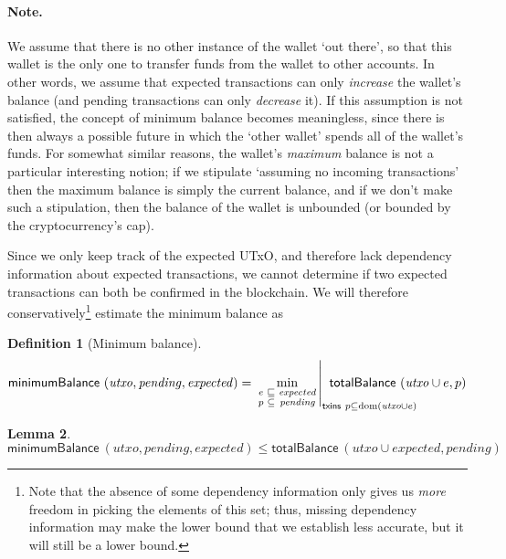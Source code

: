 \documentclass{article}
\DeclareMathOperator{\dom}{dom}
\DeclareMathOperator*{\minimum}{min}
\newtheorem{lemma}{Lemma}[section] %
\newtheorem{definition}[lemma]{Definition}
\numberwithin{equation}{lemma}
\begin{document}
\paragraph{Note.} We assume that there is no other instance of the wallet
`out there', so that this wallet is the only one to transfer funds
from the wallet to other accounts. In other words, we assume that expected
transactions can only \emph{increase} the wallet's balance (and pending
transactions can only \emph{decrease} it). If this assumption is not satisfied,
the concept of minimum balance becomes meaningless, since there is then always
a possible future in which the `other wallet' spends all of the wallet's
funds. For somewhat similar reasons, the wallet's \emph{maximum} balance
is not a particular interesting notion; if we stipulate `assuming no
incoming transactions' then the maximum balance is simply the current balance,
and if we don't make such a stipulation, then the balance of the wallet is
unbounded (or bounded by the cryptocurrency's cap).

Since we only keep track of the expected UTxO, and therefore lack dependency
information about expected transactions, we cannot determine if two expected
transactions can both be confirmed in the blockchain. We will therefore
conservatively\footnote{ Note that the absence of some dependency information
only gives us \emph{more} freedom in picking the elements of this set; thus,
missing dependency information may make the lower bound that we establish less
accurate, but it will still be a lower bound.} estimate the minimum balance as
%
\begin{definition}[Minimum balance]
\begin{equation*}
  \mathsf{minimumBalance} ~ (\mathit{utxo}, \mathit{pending}, \mathit{expected})
= \left.
  \minimum_{\begin{smallmatrix}
              e & \sqsubseteq & \mathit{expected} \\
              p & \subseteq   & \mathit{pending}
            \end{smallmatrix}}
  \right|_{\mathrlap{\mathsf{txins} ~ p \subseteq \dom(\mathit{utxo} \cup e)}}
  ~ \mathsf{totalBalance} ~ (\mathit{utxo} \cup e, p)
\end{equation*}
\end{definition}

\begin{lemma}
\begin{equation*}
    \mathsf{minimumBalance} ~ (\mathit{utxo}, \mathit{pending}, \mathit{expected})
\le \mathsf{totalBalance}   ~ (\mathit{utxo} \cup \mathit{expected}, \mathit{pending})
\end{equation*}
\label{lem:minimumBalance_bound}
\end{lemma}
\end{document}

